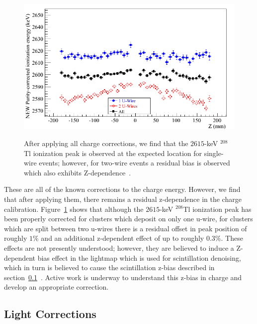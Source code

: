 \begin{figure}
\begin{center}
\includegraphics[keepaspectratio=true,width=\textwidth]{ResidualChargeZBias.png}
\end{center}
\renewcommand{\baselinestretch}{1}
\small\normalsize
\begin{quote}
\caption{After applying all charge corrections, we find that the $2615$-keV $^{208}$Tl ionization peak is observed at the expected location for single-wire events; however, for two-wire events a residual bias is observed which also exhibits Z-dependence~\cite{EnergyDocumentRun2ab}.}
\label{fig:ResidualChargeZBias}
\end{quote}
\end{figure}
\renewcommand{\baselinestretch}{2}
\small\normalsize

These are all of the known corrections to the charge energy.  However, we find that after applying them, there remains a residual z-dependence in the charge calibration.  Figure~\ref{fig:ResidualChargeZBias} shows that although the $2615$-keV $^{208}$Tl ionization peak has been properly corrected for clusters which deposit on only one u-wire, for clusters which are split between two u-wires there is a residual offset in peak position of roughly $1\%$ and an additional z-dependent effect of up to roughly $0.3\%$.  These effects are not presently understood; however, they are believed to induce a Z-dependent bias effect in the lightmap which is used for scintillation denoising, which in turn is believed to cause the scintillation z-bias described in section~\ref{sec:ResultEnergyLight}~\cite{EnergyDocumentRun2ab}.  Active work is underway to understand this z-bias in charge and develop an appropriate correction.

\subsection{Light Corrections}\label{sec:ResultEnergyLight}

